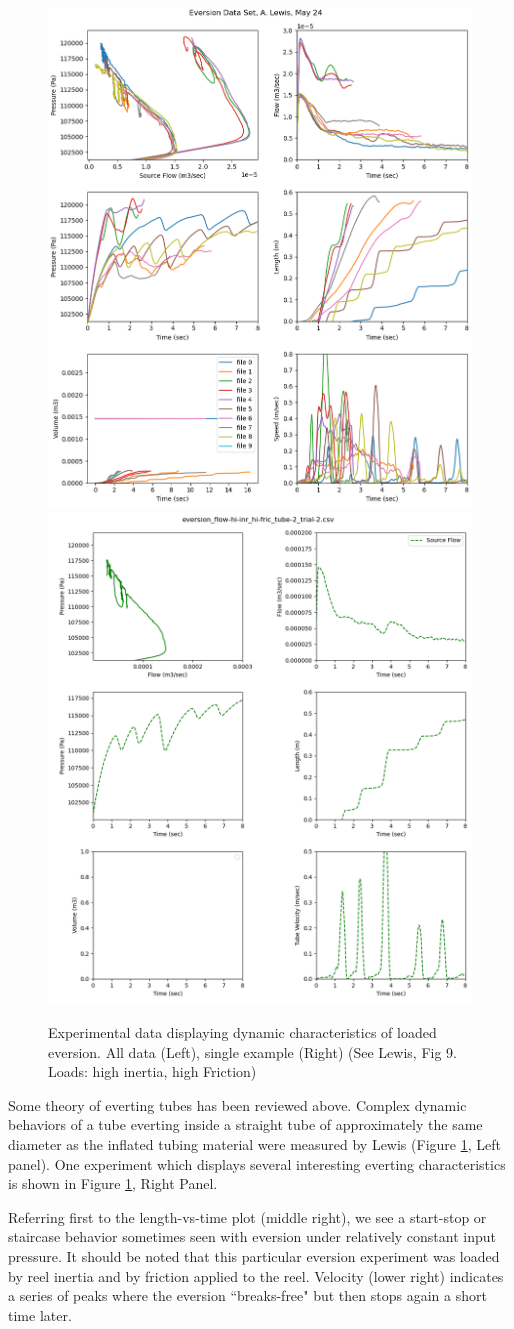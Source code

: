 \documentclass[letterpaper]{article}
\begin{document}
\begin{figure}[h]\centering
\includegraphics[width=.475\textwidth]{ExpDataExampleAll.png}
\includegraphics[width=.475\textwidth]{ExpDataExample.png}
\caption{Experimental data displaying dynamic characteristics of loaded eversion.  All data (Left), single example (Right) (See Lewis, Fig 9. Loads: high inertia, high Friction)}
\label{Fig:experData}
\end{figure}

Some theory of everting tubes has been reviewed above.   Complex dynamic behaviors of a tube everting
inside
a straight tube of approximately the same diameter as the inflated tubing material were measured
by Lewis \cite{xxxx} (Figure \ref{Fig:experData}, Left panel).   One experiment which displays several interesting everting characteristics
is shown in Figure \ref{Fig:experData}, Right Panel.

Referring first to the length-vs-time plot (middle right), we see a start-stop or staircase
behavior sometimes seen with eversion under relatively constant input pressure.   It
should be noted that this particular eversion experiment was loaded by reel inertia and
by friction applied to the reel.  Velocity (lower right) indicates a series of peaks where the eversion
``breaks-free" but then stops again a short time later.
\end{document}
